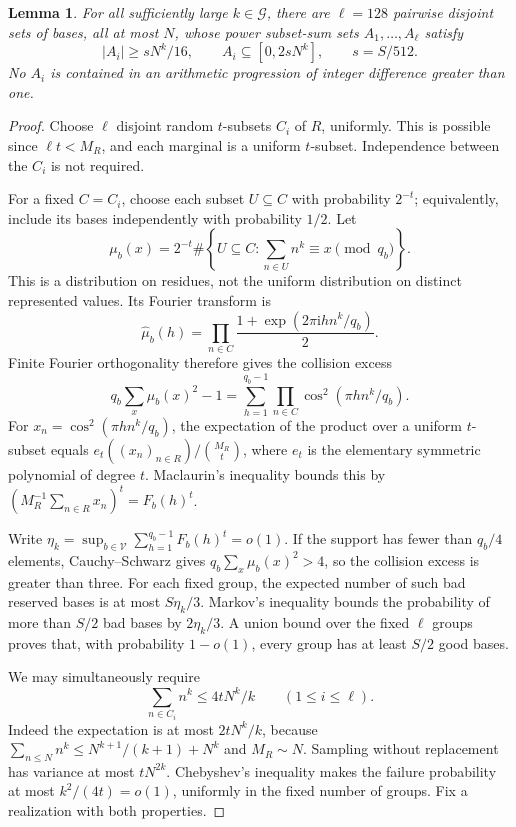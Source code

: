 \documentclass[11pt]{amsart}
\numberwithin{equation}{section}
\newtheorem{lemma}[theorem]{Lemma}
\theoremstyle{remark}
\newcommand{\ii}{\mathrm i}
\begin{document}
\begin{lemma}\label{lem:groups}
For all sufficiently large \(k\in\mathcal G\), there are \(\ell=128\)
pairwise disjoint sets of bases, all at most \(N\), whose power
subset-sum sets \(A_1,\ldots,A_\ell\) satisfy
\begin{equation}\label{eq:groups}
 |A_i|\ge sN^k/16,\qquad A_i\subseteq[0,2sN^k],
 \qquad s=S/512.
\end{equation}
No \(A_i\) is contained in an arithmetic progression of integer
difference greater than one.
\end{lemma}
\begin{proof}
Choose \(\ell\) disjoint random \(t\)-subsets \(C_i\) of \(R\), uniformly.
This is possible since \(\ell t<M_R\), and each marginal is a uniform
\(t\)-subset. Independence between the \(C_i\) is not required.

For a fixed \(C=C_i\), choose each subset \(U\subseteq C\) with
probability \(2^{-t}\); equivalently, include its bases independently
with probability \(1/2\). Let
\[
 \mu_b(x)=2^{-t}\#\left\{U\subseteq C:
             \sum_{n\in U}n^k\equiv x\pmod {q_b}\right\}.
\]
This is a distribution on residues, not the uniform distribution
on distinct represented values. Its Fourier transform is
\[
 \widehat\mu_b(h)=
 \prod_{n\in C}\frac{1+\exp(2\pi\ii hn^k/q_b)}2.
\]
Finite Fourier orthogonality therefore gives the collision excess
\[
 q_b\sum_x\mu_b(x)^2-1
 =\sum_{h=1}^{q_b-1}\prod_{n\in C}\cos^2(\pi hn^k/q_b).
\]
For \(x_n=\cos^2(\pi hn^k/q_b)\), the expectation of the product over
a uniform \(t\)-subset equals \(e_t((x_n)_{n\in R})/\binom{M_R}{t}\),
where \(e_t\) is the elementary symmetric polynomial of degree \(t\).
Maclaurin's inequality bounds this by
\((M_R^{-1}\sum_{n\in R}x_n)^t=F_b(h)^t\).

Write \(\eta_k=\sup_{b\in\mathcal V}\sum_{h=1}^{q_b-1}F_b(h)^t=o(1)\).
If the support has fewer than \(q_b/4\) elements, Cauchy--Schwarz gives
\(q_b\sum_x\mu_b(x)^2>4\), so the collision excess is greater than three.
For each fixed group, the expected number of such bad reserved bases
is at most \(S\eta_k/3\). Markov's inequality bounds the probability
of more than \(S/2\) bad bases by \(2\eta_k/3\).
A union bound over the fixed \(\ell\) groups proves that, with
probability \(1-o(1)\), every group has at least \(S/2\) good bases.

We may simultaneously require
\begin{equation}\label{eq:initialspan}
 \sum_{n\in C_i}n^k\le4tN^k/k\qquad(1\le i\le\ell).
\end{equation}
Indeed the expectation is at most \(2tN^k/k\), because
\(\sum_{n\le N}n^k\le N^{k+1}/(k+1)+N^k\) and \(M_R\sim N\).
Sampling without replacement has variance at most \(tN^{2k}\).
Chebyshev's inequality makes the failure probability at most
\(k^2/(4t)=o(1)\), uniformly in the fixed number of groups.
Fix a realization with both properties.


\end{proof}
\end{document}
